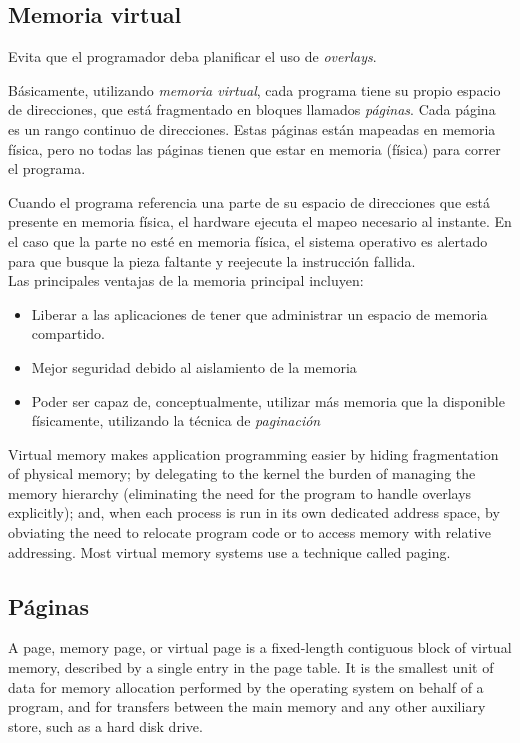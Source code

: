 \documentclass[a4paper, twoside]{article}
\begin{document}
\subsection{Memoria virtual}
Evita que el programador deba planificar el uso de \emph{overlays}.

Básicamente, utilizando \emph{memoria virtual}, cada programa tiene su propio espacio de direcciones, que está fragmentado en bloques llamados \emph{páginas}. Cada página es un rango continuo de direcciones. Estas páginas están mapeadas en memoria física, pero no todas las páginas tienen que estar en memoria (física) para correr el programa.

Cuando el programa referencia una parte de su espacio de direcciones que está presente en memoria física, el hardware ejecuta el mapeo necesario al instante. En el caso que la parte no esté en memoria física, el sistema operativo es alertado para que busque la pieza faltante y reejecute la instrucción fallida.\\

Las principales ventajas de la memoria principal incluyen:
\begin{itemize}
	\item Liberar a las aplicaciones de tener que administrar un espacio de memoria compartido.
	\item Mejor seguridad debido al aislamiento de la memoria
	\item Poder ser capaz de, conceptualmente, utilizar más memoria que la disponible físicamente, utilizando la técnica de \emph{paginación}
\end{itemize}
Virtual memory makes application programming easier by hiding fragmentation of physical memory; by delegating to the kernel the burden of managing the memory hierarchy (eliminating the need for the program to handle overlays explicitly); and, when each process is run in its own dedicated address space, by obviating the need to relocate program code or to access memory with relative addressing.
Most virtual memory systems use a technique called paging.

\subsection{Páginas}
A page, memory page, or virtual page is a fixed-length contiguous block of virtual memory, described by a single entry in the page table. It is the smallest unit of data for memory allocation performed by the operating system on behalf of a program, and for transfers between the main memory and any other auxiliary store, such as a hard disk drive.
\end{document}
